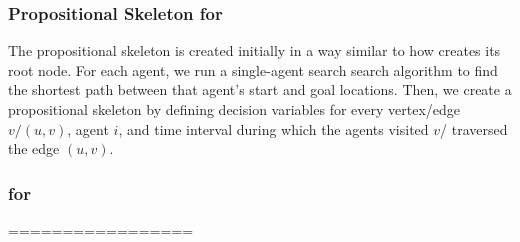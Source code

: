 \subsubsection{Propositional Skeleton for \mapfr}




The propositional skeleton is created initially in a way similar to how \ccbs creates its root \ct node. For each agent, we run a single-agent search search algorithm to find the shortest path between that agent's start and goal locations. 
Then, we create a propositional skeleton by defining decision variables for every vertex/edge $v/(u,v)$, agent $i$, and time interval during which the agents visited $v$/ traversed the edge $(u,v)$. 


\subsubsection{\decidet for \mapfr}



=================




